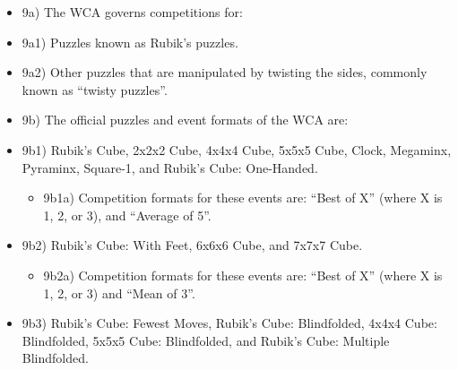 \begin{itemize}
\item
  9a) The WCA governs competitions for:
\item
  9a1) Puzzles known as Rubik's puzzles.
\item
  9a2) Other puzzles that are manipulated by twisting the sides,
  commonly known as ``twisty puzzles''.
\item
  9b) The official puzzles and event formats of the WCA are:
\item
  9b1) Rubik's Cube, 2x2x2 Cube, 4x4x4 Cube, 5x5x5 Cube, Clock,
  Megaminx, Pyraminx, Square-1, and Rubik's Cube: One-Handed.

  \begin{itemize}
  \item
    9b1a) Competition formats for these events are: ``Best of X'' (where
    X is 1, 2, or 3), and ``Average of 5''.
  \end{itemize}
\item
  9b2) Rubik's Cube: With Feet, 6x6x6 Cube, and 7x7x7 Cube.

  \begin{itemize}
  \item
    9b2a) Competition formats for these events are: ``Best of X'' (where
    X is 1, 2, or 3) and ``Mean of 3''.
  \end{itemize}
\item
  9b3) Rubik's Cube: Fewest Moves, Rubik's Cube: Blindfolded, 4x4x4
  Cube: Blindfolded, 5x5x5 Cube: Blindfolded, and Rubik's Cube: Multiple
  Blindfolded.


\end{itemize}
